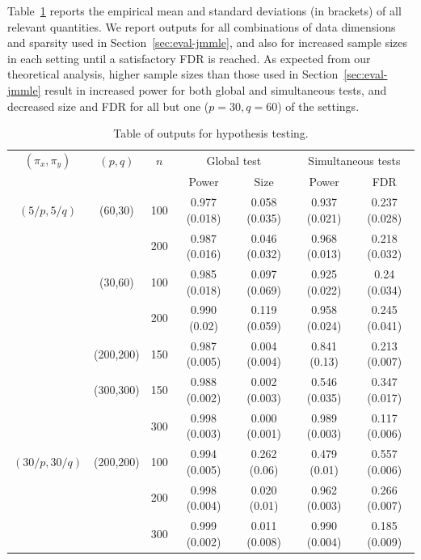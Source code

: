 Table~\ref{table:simtable3} reports the empirical mean and standard deviations (in brackets) of all relevant quantities. We report outputs for all combinations of data dimensions and sparsity used in Section~\ref{sec:eval-jmmle}, and also for increased sample sizes in each setting until a satisfactory FDR is reached. As expected from our theoretical analysis, higher sample sizes than those used in Section~\ref{sec:eval-jmmle} result in increased power for both global and simultaneous tests, and decreased size and FDR for all but one ($p=30, q=60$) of the settings.

%
\begin{scriptsize}
\begin{table}
    \begin{tabular}{ccccccc}
    \hline
$(\pi_x, \pi_y)$ & $(p,q)$   & $n$ & \multicolumn{2}{c}{Global test} & \multicolumn{2}{c}{Simultaneous tests}\\\cline{4-7}
 & & & Power     & Size			   & Power         & FDR           \\ \hline
    $(5/p, 5/q)$ & (60,30)   & 100 & 0.977 (0.018) & 0.058 (0.035) & 0.937 (0.021) & 0.237 (0.028) \\
    ~            & ~         & 200 & 0.987 (0.016) & 0.046 (0.032) & 0.968 (0.013) & 0.218 (0.032) \\
    ~            & (30,60)   & 100 & 0.985 (0.018) & 0.097 (0.069) & 0.925 (0.022) & 0.24 (0.034)  \\
    ~            & ~         & 200 & 0.990 (0.02)  & 0.119 (0.059) & 0.958 (0.024) & 0.245 (0.041) \\
    ~            & (200,200) & 150 & 0.987 (0.005) & 0.004 (0.004) & 0.841 (0.13)  & 0.213 (0.007) \\
    ~            & (300,300) & 150 & 0.988 (0.002) & 0.002 (0.003) & 0.546 (0.035) & 0.347 (0.017) \\
    ~            & ~         & 300 & 0.998 (0.003) & 0.000 (0.001) & 0.989 (0.003) & 0.117 (0.006) \\ \hline
  $(30/p, 30/q)$ & (200,200) & 100 & 0.994 (0.005) & 0.262 (0.06)  & 0.479 (0.01)  & 0.557 (0.006) \\
    ~            & ~         & 200 & 0.998 (0.004) & 0.020 (0.01)  & 0.962 (0.003) & 0.266 (0.007) \\
    ~            & ~         & 300 & 0.999 (0.002) & 0.011 (0.008) & 0.990 (0.004) & 0.185 (0.009) \\ \hline
    \end{tabular}
    \caption{Table of outputs for hypothesis testing.}
    \label{table:simtable3}
\end{table}
\end{scriptsize}

